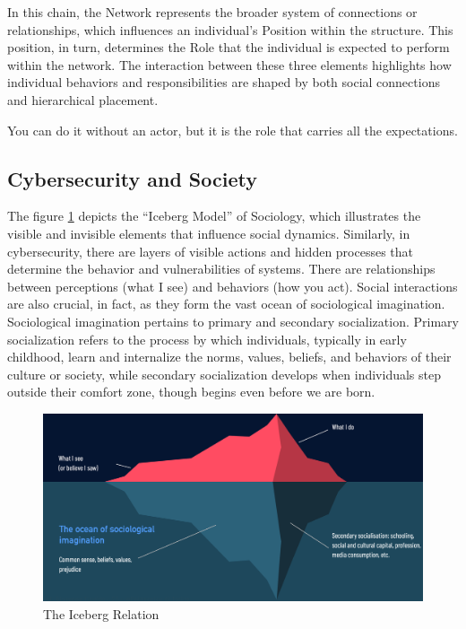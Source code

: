 In this chain, the Network represents the broader system of connections or relationships, which influences an individual’s Position within the structure. This position, in turn, determines the Role that the individual is expected to perform within the network. The interaction between these three elements highlights how individual behaviors and responsibilities are shaped by both social connections and hierarchical placement.

\begin{displayquote}
    You can do it without an actor, but it is the role that carries all the expectations.
\end{displayquote}

\subsection{Cybersecurity and Society}

The figure \ref{fig:Sociology_Iceberg} depicts the “Iceberg Model” of Sociology, which illustrates the visible and invisible elements that influence social dynamics. Similarly, in cybersecurity, there are layers of visible actions and hidden processes that determine the behavior and vulnerabilities of systems.
There are relationships between perceptions (what I see) and behaviors (how you act). Social interactions are also crucial, in fact, as they form the vast ocean of sociological imagination. Sociological imagination pertains to primary and secondary socialization. Primary socialization refers to the process by which individuals, typically in early childhood, learn and internalize the norms, values, beliefs, and behaviors of their culture or society, while secondary socialization develops when individuals step outside their comfort zone, though begins even before we are born.

\begin{figure}[H]
    \includegraphics[width=\linewidth]{Images/Sociology/Iceberg.png}
    \caption{The Iceberg Relation}
    \label{fig:Sociology_Iceberg}
\end{figure}

